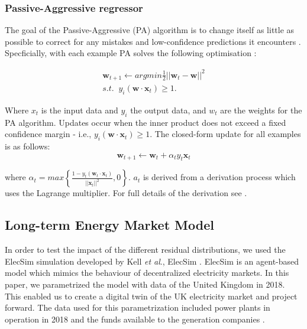 \documentclass[final,3p,times,twocolumn,numbers]{elsarticle}
\begin{document}
\subsubsection{Passive-Aggressive regressor}

The goal of the Passive-Aggressive (PA) algorithm is to change itself as little as possible to correct for any mistakes and low-confidence predictions it encounters \cite{Gzik2014}. Specficially, with each example PA solves the following optimisation \cite{Ma2009}:

\begin{align}
    \boldsymbol{w}_{t+1}\leftarrow argmin \frac{1}{2}\left|\left|{\boldsymbol{w}_t-\boldsymbol{w}}\right|\right|^2 \\
    s.t. \; \; y_i(\boldsymbol{w}\cdot \boldsymbol{x}_t)\geq1.
\end{align}

\noindent Where $x_t$ is the input data and $y_i$ the output data, and $w_t$ are the weights for the PA algorithm. Updates occur when the inner product does not exceed a fixed confidence margin - i.e., $y_i(\boldsymbol{w}\cdot \boldsymbol{x}_t)\geq1$. The closed-form update for all examples is as follows:
\begin{equation}
    \boldsymbol{w}_{t+1}\leftarrow \boldsymbol{w}_{t} + \alpha_t y_t \boldsymbol{x}_t
\end{equation}

\noindent where $\alpha_t=max\left\{\frac{1-y_t(\boldsymbol{w}_t\cdot\boldsymbol{x}_t)}{\left|\left|\boldsymbol{x}_t\right|\right|^2},0\right\}$. $a_t$ is derived from a derivation process which uses the Lagrange multiplier. For full details of the derivation see \cite{Gzik2014}.

\subsection{Long-term Energy Market Model}


In order to test the impact of the different residual distributions, we used the ElecSim simulation developed by Kell \textit{et al}., ElecSim \cite{Kell,Kell2020}. ElecSim is an agent-based model which mimics the behaviour of decentralized electricity markets. In this paper, we parametrized the model with data of the United Kingdom in 2018. This enabled us to create a digital twin of the UK electricity market and project forward. The data used for this parametrization included power plants in operation in 2018 and the funds available to the generation companies \cite{dukes_511, companies_house}.
\end{document}
